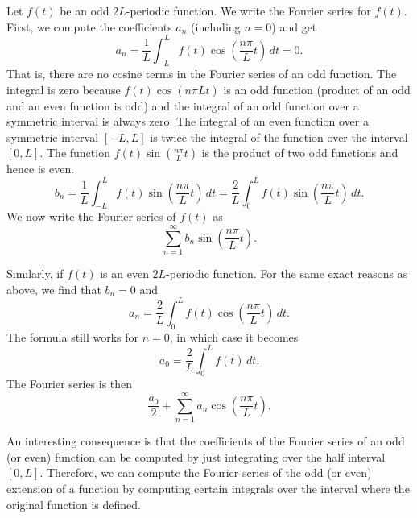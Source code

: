 Let $f(t)$ be an odd $2L$-periodic function.  We write 
the Fourier series for $f(t)$.  First, we compute the coefficients $a_n$ (including
$n=0$) and get
\begin{equation*}
a_n = \frac{1}{L} \int_{-L}^L f(t) \cos \left( \frac{n \pi}{L} t \right)
\, dt = 0 .
\end{equation*}
That is, there are no cosine terms in the Fourier series of an odd function.
The integral is zero
because $f(t) \cos \left( {n \pi}{L} t \right)$
is an odd function (product of an odd and an
even function is odd) and the integral of an odd function over a symmetric
interval is always zero.
The integral of an even function over a symmetric interval
$[-L,L]$ is twice the integral of the function over the interval $[0,L]$.
The function $f(t) \sin \left( \frac{n \pi}{L} t \right)$ is the product of two odd
functions and hence is even.
\begin{equation*}
b_n = 
\frac{1}{L} \int_{-L}^L f(t) \sin \left( \frac{n \pi}{L} t \right) \, dt =
\frac{2}{L} \int_{0}^L f(t) \sin \left( \frac{n \pi}{L} t \right) \, dt .
\end{equation*}
We now write the Fourier series of $f(t)$ as
\begin{equation*}
\sum_{n=1}^\infty b_n \sin \left( \frac{n \pi}{L} t \right) .
\end{equation*}

Similarly, if $f(t)$ is an even $2L$-periodic function.  For the same exact
reasons as above, we find that $b_n = 0$ and
\begin{equation*}
a_n = 
\frac{2}{L} \int_{0}^L f(t) \cos \left( \frac{n \pi}{L} t \right) \, dt .
\end{equation*}
The formula still works for $n=0$, in which case it becomes
\begin{equation*}
a_0 = 
\frac{2}{L} \int_{0}^L f(t) \, dt .
\end{equation*}
The Fourier series is then
\begin{equation*}
\frac{a_0}{2}
+
\sum_{n=1}^\infty a_n \cos \left( \frac{n \pi}{L} t \right) .
\end{equation*}

An interesting consequence is that the coefficients of the Fourier series of
an odd (or even) function can be computed by just integrating over the half
interval $[0,L]$.  Therefore, we can compute the Fourier series of
the odd (or even) extension of a
function by computing certain integrals over the interval
where the original function is defined.

